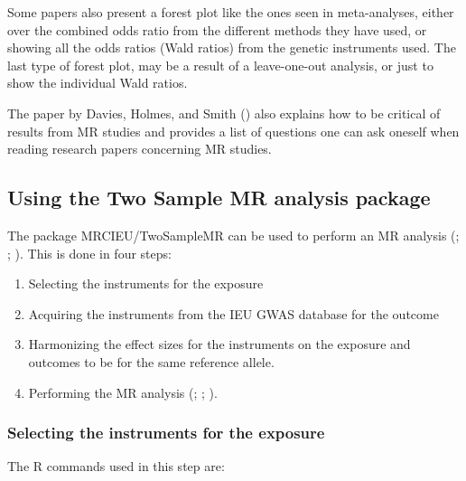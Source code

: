 \documentclass[
]{article}
\providecommand{\tightlist}{%
  \setlength{\itemsep}{0pt}\setlength{\parskip}{0pt}}
\begin{document}
Some papers also present a forest plot like the ones seen in
meta-analyses, either over the combined odds ratio from the different
methods they have used, or showing all the odds ratios (Wald ratios)
from the genetic instruments used. The last type of forest plot, may be
a result of a leave-one-out analysis, or just to show the individual
Wald ratios.

The paper by Davies, Holmes, and Smith ()
also explains how to be critical of results from MR studies and provides
a list of questions one can ask oneself when reading research papers
concerning MR studies.

\subsection{Using the Two Sample MR analysis
package}\label{using-the-two-sample-mr-analysis-package}

The package MRCIEU/TwoSampleMR can be used to perform an MR analysis
(;
;
). This is done in four steps:

\begin{enumerate}
\def\labelenumi{\arabic{enumi}.}
\tightlist
\item
  Selecting the instruments for the exposure
\item
  Acquiring the instruments from the IEU GWAS database for the outcome
\item
  Harmonizing the effect sizes for the instruments on the exposure and
  outcomes to be for the same reference allele.
\item
  Performing the MR analysis (; ; ).
\end{enumerate}

\subsubsection{Selecting the instruments for the
exposure}\label{selecting-the-instruments-for-the-exposure}

The R commands used in this step are:
\end{document}
